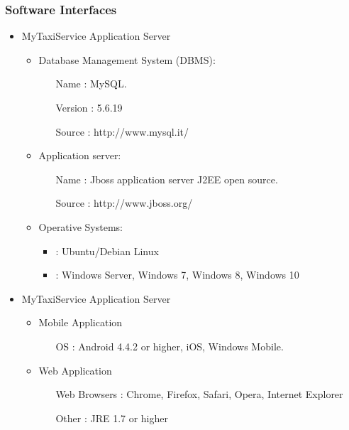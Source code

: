 \documentclass[11pt, a4paper,titlepage]{article}
\newcommand{\productname}{MyTaxiService }
\begin{document}
\subsubsection{Software Interfaces}
\begin{itemize}
	\item \productname Application Server
		\begin{itemize}
			\item Database Management System (DBMS):
			\begin{itemize}
				\item[Name]: MySQL.
				\item[Version]: 5.6.19
				\item[Source]: http://www.mysql.it/
			\end{itemize}
			\item Application server:
			\begin{itemize}
				\item[Name]:  Jboss application server J2EE open source.
				\item[Source]: http://www.jboss.org/
			\end{itemize}
			\item Operative Systems:
			\begin{itemize}
				\item: Ubuntu/Debian Linux
				\item: Windows Server, Windows 7, Windows 8, Windows 10
			\end{itemize}
		\end{itemize}
		
	\item \productname Application Server
	\begin{itemize}
		\item Mobile Application
		\begin{itemize}
			\item[OS]: Android 4.4.2 or higher, iOS, Windows Mobile.
		\end{itemize}
	\end{itemize}
	\begin{itemize}
		\item Web Application
		\begin{itemize}
			\item[Web Browsers]: Chrome, Firefox, Safari, Opera, Internet Explorer
			\item[Other]: JRE 1.7 or higher
		\end{itemize}
	\end{itemize}	
\end{itemize}
\end{document}
